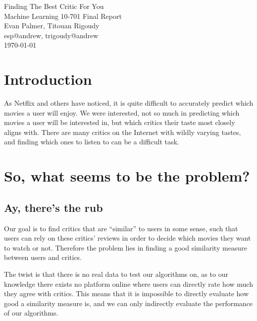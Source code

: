 \documentclass[12pt]{article}
\makeatletter
\newcommand{\myname}{Evan Palmer, Titouan Rigoudy}
\newcommand{\myandrew}{esp@andrew, trigoudy@andrew}
\newcommand{\thedate}{\today}
\makeatother
\begin{document}
	\medskip    
	\thispagestyle{plain}
	\begin{center}                 
	{\LARGE Finding The Best Critic For You} \\
	\medskip
	Machine Learning 10-701 Final Report \\
	\smallskip
	\myname \\
	\myandrew \\
	\thedate \\
	\end{center}
	\vspace{0.5cm}

\section{Introduction}

As Netflix and others have noticed, it is quite difficult to accurately predict
which movies a user will enjoy. We were interested, not so much in predicting
which movies a user will be interested in, but which critics their taste most
closely aligns with. There are many critics on the Internet with wildly varying
tastes, and finding which ones to listen to can be a difficult task.



\section{So, what seems to be the problem?}

\subsection{Ay, there's the rub} %

Our goal is to find critics that are ``similar'' to users in some sense, such
that users can rely on these critics' reviews in order to decide which movies
they want to watch or not. Therefore the problem lies in finding a good
similarity measure between users and critics.

The twist is that there is no real data to test our algorithms on, as to our
knowledge there exists no platform online where users can directly rate how
much they agree with critics. This means that it is impossible to directly
evaluate how good a similarity measure is, and we can only indirectly evaluate
the performance of our algorithms.
\end{document}
